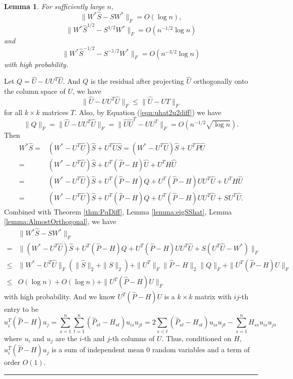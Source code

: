 \documentclass[a4paper]{article}
\newenvironment{proof}{{\bf Proof:  }}{\hfill\rule{2mm}{2mm}}
\newtheorem{lemma}[fact]{Lemma}
\begin{document}
\begin{lemma}
\label{lemma:exchange}
For sufficiently large $n$,
\[
	\| W^* \hat{S} - S W^* \|_F = O(\log n),
\]
\[
	\|W^* \hat{S}^{1/2} - S^{1/2} W^* \|_F = O(n^{-1/2} \log n)
\]
and
\[
	\| W^* \hat{S}^{-1/2} - S^{-1/2} W^* \|_F = O(n^{-3/2} \log n)
\]
with high probability.
\end{lemma}
\begin{proof}
Let $Q = \hat{U} - U U^T \hat{U}$. And $Q$ is the residual after projecting $\hat{U}$ orthogonally onto the column space of $U$, we have
\[
	\| \hat{U} - U U^T \hat{U} \|_F \le \| \hat{U} - U T \|_F
\]
for all $k \times k$ matrices $T$. Also, by Equation (\ref{eqn:uhat2u2diff}) we have
\begin{equation}
\label{eqn:QFnorm}
	\| Q \|_F = \| \hat{U} - U U^T \hat{U} \|_F
	= \| \hat{U} \hat{U}^T - U U^T \|_F
    = O(n^{-1/2} \sqrt{\log n}).
\end{equation}
Then
\begin{align*}
	W^* \hat{S} = & (W^* - U^T \hat{U}) \hat{S} + U^T \hat{U} \hat{S}
    = (W^* - U^T \hat{U}) \hat{S} + U^T \hat{P} \hat{U} \\
    = & (W^* - U^T \hat{U}) \hat{S} + U^T (\hat{P} - H) \hat{U} + U^T H \hat{U} \\
    = & (W^* - U^T \hat{U}) \hat{S} + U^T (\hat{P} - H) Q + U^T (\hat{P} - H) U U^T \hat{U} + U^T H \hat{U} \\
    = & (W^* - U^T \hat{U}) \hat{S} + U^T (\hat{P} - H) Q + U^T (\hat{P} - H) U U^T \hat{U} + S U^T \hat{U}.
\end{align*}
Combined with Theorem \ref{thm:PqDiff}, Lemma \ref{lemma:eigSShat}, Lemma \ref{lemma:AlmostOrthogonal}, we have
\begin{align*}
	& \| W^* \hat{S} - S W^* \|_F \\
    = & \| (W^* - U^T \hat{U}) \hat{S} + U^T (\hat{P} - H) Q + U^T (\hat{P} - H) U U^T \hat{U} + S (U^T \hat{U} - W^*)\|_F \\
    \le & \| W^* - U^T \hat{U} \|_F (\| \hat{S} \|_2 + \| S \|_2) + \| U^T \|_F \| \hat{P} - H\|_2 \| Q \|_F + \| U^T (\hat{P} - H) U \|_F \\
    \le & O(\log n) + O(\log n) + \| U^T (\hat{P} - H) U \|_F
\end{align*}
with high probability. And we know $U^T (\hat{P} - H) U$ is a $k \times k$ matrix with $ij$-th entry to be
\[
	u_i^T (\hat{P} - H) u_j
    = \sum_{s=1}^n \sum_{t=1}^n (\hat{P}_{st} - H_{st}) u_{is} u_{jt}
    = 2 \sum_{s<t} (\hat{P}_{st} - H_{st}) u_{is} u_{jt} - \sum_{s=1}^n H_{ss} u_{is} u_{js}
\]
where $u_i$ and $u_j$ are the $i$-th and $j$-th columns of $U$. Thus, conditioned on $H$, $u_i^T (\hat{P} - H) u_j$ is a sum of independent mean 0 random variables and a term of order $O(1)$.



\end{proof}
\end{document}
